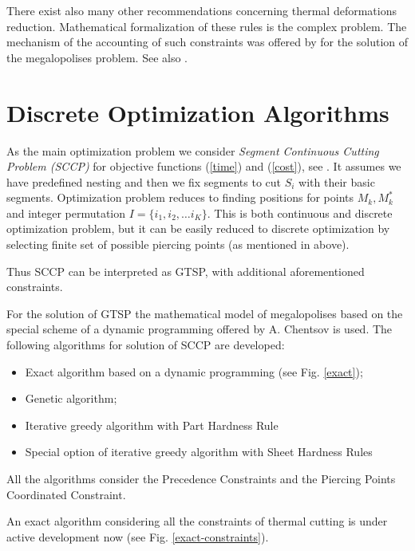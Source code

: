 \documentclass{../download/tPRS2e}
\begin{document}
There exist also many other recommendations concerning thermal deformations reduction.
Mathematical formalization of these rules is the complex problem.
The mechanism of the accounting of such constraints was offered by \cite{chentsov_dynamic_2013}
for the solution of the megalopolises problem. See also \cite{chentsov_model_2015}.

\section{Discrete Optimization Algorithms}

As the main optimization problem we consider
\textit{Segment Continuous Cutting Problem (SCCP)}
for objective functions (\ref{time}) and (\ref{cost}),
see \cite{petunin_local_2014}.
It assumes we have predefined nesting and then we fix segments to cut $S_i$
with their basic segments.
Optimization problem reduces to finding positions for points  $M_k, M^*_k$
and integer permutation $I = \{i_1, i_2, \dots i_K\}$.
This is both continuous and discrete optimization problem,
but it can be easily reduced to discrete optimization by selecting finite set of possible piercing points (as mentioned in above).

Thus SCCP can be interpreted as GTSP, with additional aforementioned constraints.

For the solution of GTSP the mathematical model of megalopolises
based on the special scheme of a dynamic programming offered by A. Chentsov is used.
The following algorithms for solution of SCCP are developed:
\begin{itemize}
\item Exact algorithm based on a dynamic programming (see Fig. \ref{exact});
\item Genetic algorithm;
\item Iterative greedy algorithm with Part Hardness Rule
\item Special option of iterative greedy algorithm with Sheet Hardness Rules
\end{itemize}

All the algorithms consider the Precedence Constraints and the Piercing Points Coordinated Constraint.

An exact algorithm considering all the constraints of thermal cutting is under active development now
(see Fig. \ref{exact-constraints}).
\end{document}

